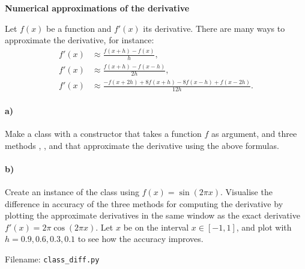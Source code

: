 \begin{Problem}{\textbf{Numerical approximations of the derivative}} \label{prob74}

\noindent Let $f(x)$ be a function and $f'(x)$ its derivative. There are many ways to
approximate the derivative, for instance:
\begin{align*}
    f'(x) &\approx  \frac{f(x+h)-f(x)}{h}, \\
    f'(x) &\approx  \frac{f(x+h)-f(x-h)}{2h}, \\
    f'(x) &\approx  \frac{-f(x+2h)+8f(x+h)-8f(x-h)+f(x-2h)}{12h} .
\end{align*}
\paragraph{a)}
Make a class  with a constructor that takes a function $f$
as argument, and three methods , ,
and  that approximate the derivative using the above formulas.

\paragraph{b)}
Create an instance of the class 
using $f(x) = \sin\left( 2 \pi x \right)$. Visualise the difference
in accuracy of the three methods for computing the derivative by
plotting the approximate derivatives in the same window as the exact
derivative $f'(x) = 2 \pi \cos(2 \pi x)$. Let $x$ be on the interval
$x \in [-1, 1]$, and plot with $h = 0.9, 0.6, 0.3, 0.1$ to see how the
accuracy improves.

Filename: \texttt{class\_diff.py}
\end{Problem}

